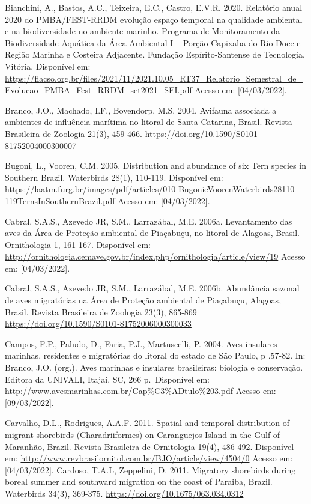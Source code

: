 \documentclass[
  oneside]{scrbook}
\begin{document}
Bianchini, A., Bastos, A.C., Teixeira, E.C., Castro, E.V.R. 2020. Relatório anual 2020 do PMBA/FEST-RRDM evolução espaço temporal na qualidade ambiental e na biodiversidade no ambiente marinho. Programa de Monitoramento da Biodiversidade Aquática da Área Ambiental I -- Porção Capixaba do Rio Doce e Região Marinha e Costeira Adjacente. Fundação Espírito-Santense de Tecnologia, Vitória. Disponível em: \url{https://flacso.org.br/files/2021/11/2021.10.05_RT37_Relatorio_Semestral_de_Evolucao_PMBA_Fest_RRDM_set2021_SEI.pdf} Acesso em: {[}04/03/2022{]}.

Branco, J.O., Machado, I.F., Bovendorp, M.S. 2004. Avifauna associada a ambientes de influência marítima no litoral de Santa Catarina, Brasil. Revista Brasileira de Zoologia 21(3), 459-466. \url{https://doi.org/10.1590/S0101-81752004000300007}

Bugoni, L., Vooren, C.M. 2005. Distribution and abundance of six Tern species in Southern Brazil. Waterbirds 28(1), 110-119. Disponível em: \url{https://laatm.furg.br/images/pdf/articles/010-BugonieVoorenWaterbirds28110-119TernsInSouthernBrazil.pdf} Acesso em: {[}04/03/2022{]}.

Cabral, S.A.S., Azevedo JR, S.M., Larrazábal, M.E. 2006a. Levantamento das aves da Área de Proteção ambiental de Piaçabuçu, no litoral de Alagoas, Brasil. Ornithologia 1, 161-167. Disponível em: \url{http://ornithologia.cemave.gov.br/index.php/ornithologia/article/view/19} Acesso em: {[}04/03/2022{]}.

Cabral, S.A.S., Azevedo JR, S.M., Larrazábal, M.E. 2006b. Abundância sazonal de aves migratórias na Área de Proteção ambiental de Piaçabuçu, Alagoas, Brasil. Revista Brasileira de Zoologia 23(3), 865-869 \url{https://doi.org/10.1590/S0101-81752006000300033}

Campos, F.P., Paludo, D., Faria, P.J., Martuscelli, P. 2004. Aves insulares marinhas, residentes e migratórias do litoral do estado de São Paulo, p .57-82. In: Branco, J.O. (org.). Aves marinhas e insulares brasileiras: biologia e conservação. Editora da UNIVALI, Itajaí, SC, 266 p.~Disponível em: \url{http://www.avesmarinhas.com.br/Cap\%C3\%ADtulo\%203.pdf} Acesso em: {[}09/03/2022{]}.

Carvalho, D.L., Rodrigues, A.A.F. 2011. Spatial and temporal distribution of migrant shorebirds (Charadriiformes) on Caranguejos Island in the Gulf of Maranhão, Brazil. Revista Brasileira de Ornitologia 19(4), 486-492. Disponível em: \url{http://www.revbrasilornitol.com.br/BJO/article/view/4504/0} Acesso em: {[}04/03/2022{]}.
Cardoso, T.A.L, Zeppelini, D. 2011. Migratory shorebirds during boreal summer and southward migration on the coast of Paraiba, Brazil. Waterbirds 34(3), 369-375. \url{https://doi.org/10.1675/063.034.0312}
\end{document}
